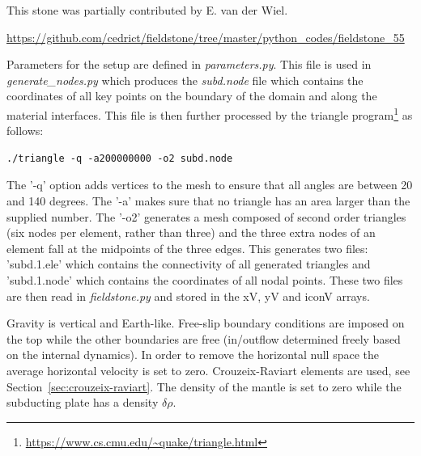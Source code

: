 \begin{mdframed}[backgroundcolor=red!5]
This stone was partially contributed by E. van der Wiel.
\end{mdframed}


\url{https://github.com/cedrict/fieldstone/tree/master/python_codes/fieldstone_55}

\vspace{1cm}

Parameters for the setup are defined in {\sl parameters.py}.
This file is used in {\sl generate\_nodes.py} which produces the
{\sl subd.node} file which contains the coordinates of all key points 
on the boundary of the domain and along the material interfaces.
This file is then further processed by the triangle 
program\footnote{\url{https://www.cs.cmu.edu/~quake/triangle.html}}
as follows:
\begin{verbatim}
./triangle -q -a200000000 -o2 subd.node
\end{verbatim}
The '-q' option adds vertices to the mesh to
ensure that all angles are between 20 and 140 degrees. 
The '-a' makes sure that no triangle has an area larger than 
the supplied number. The '-o2' generates a mesh composed 
of second order triangles (six nodes per element, rather than three) and the
three extra nodes of an element fall at the midpoints of the three edges.
This generates two files: 'subd.1.ele' which contains the connectivity 
of all generated triangles and 'subd.1.node' which contains the coordinates
of all nodal points. 
These two files are then read in {\sl fieldstone.py} and stored in the xV, yV and iconV arrays.

Gravity is vertical and Earth-like. Free-slip boundary conditions are imposed on the top while 
the other boundaries are free (in/outflow determined freely based on the internal dynamics). 
In order to remove the horizontal null space the average horizontal velocity is set to zero. 
Crouzeix-Raviart elements are used, see Section~\ref{sec:crouzeix-raviart}.
The density of the mantle is set to zero while the subducting plate has a density $\delta\rho$. 

